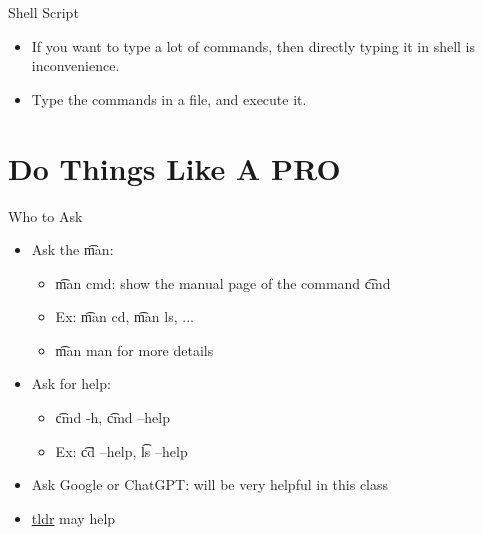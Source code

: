 \begin{frame}{Shell Script}
\begin{itemize}
\item If you want to type a lot of commands, then directly typing it in shell is inconvenience.
\item Type the commands in a file, and execute it.
\end{itemize}
\end{frame}

\section{Do Things Like A PRO}

\begin{frame}{Who to Ask}
\begin{itemize}
\item Ask the \t{man}:
\begin{itemize}
\item \t{man cmd}: show the manual page of the command \t{cmd}
\item Ex: \t{man cd}, \t{man ls}, ...
\item \t{man man} for more details
\end{itemize}
\item Ask for help:
\begin{itemize}
\item \t{cmd -h}, \t{cmd --help}
\item Ex: \t{cd --help}, \t{ls --help}
\end{itemize}
\item Ask Google or ChatGPT: will be very helpful in this class
\item \href{https://github.com/tldr-pages/tldr}{tldr} may help
\end{itemize}
\end{frame}

